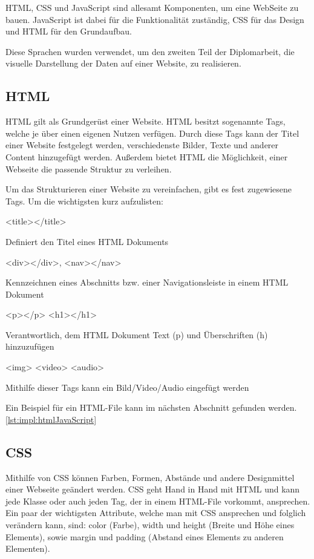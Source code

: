 HTML, CSS und JavaScript sind allesamt Komponenten, um eine WebSeite zu bauen. JavaScript ist dabei für die Funktionalität zuständig, CSS für das Design und HTML für den Grundaufbau.

Diese Sprachen wurden verwendet, um den zweiten Teil der Diplomarbeit, die visuelle Darstellung der Daten auf einer Website, zu realisieren.

\subsection{HTML}
HTML gilt als Grundgerüst einer Website. HTML besitzt sogenannte Tags, welche je über einen eigenen Nutzen verfügen. Durch diese Tags kann der Titel einer Website festgelegt werden, verschiedenste Bilder, Texte und anderer Content hinzugefügt werden. Außerdem bietet HTML die Möglichkeit, einer Webseite die passende Struktur zu verleihen. \cite{durchstartenHTML}

Um das Strukturieren einer Website zu vereinfachen, gibt es fest zugewiesene Tags. Um die wichtigsten kurz aufzulisten:
 
\begin{compactitem}
    \item [<title></title>]
    \item Definiert den Titel eines HTML Dokuments
    \item [<div></div>, <nav></nav>]
    \item Kennzeichnen eines Abschnitts bzw. einer Navigationsleiste in einem HTML Dokument
    \item [<p></p> <h1></h1>]
    \item Verantwortlich, dem HTML Dokument Text (p) und Überschriften (h) hinzuzufügen
    \item [<img> <video> <audio>]
    \item Mithilfe dieser Tags kann ein Bild/Video/Audio eingefügt werden
\end{compactitem}\cite{durchstartenHTML}

Ein Beispiel für ein HTML-File kann im nächsten Abschnitt gefunden werden. \ref{lst:impl:htmlJavaScript}
 
\subsection{CSS}
Mithilfe von CSS können Farben, Formen, Abstände und andere Designmittel einer Webseite geändert werden. CSS geht Hand in Hand mit HTML und kann jede Klasse oder auch jeden Tag, der in einem HTML-File vorkommt, ansprechen. Ein paar der wichtigsten Attribute, welche man mit CSS ansprechen und folglich verändern kann, sind: color (Farbe), width und height (Breite und Höhe eines Elements), sowie margin und padding (Abstand eines Elements zu anderen Elementen).
 
